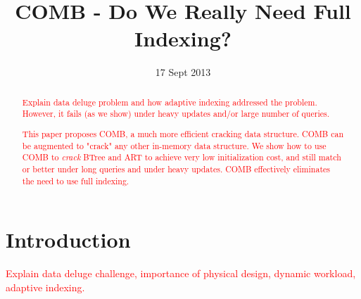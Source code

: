 \documentclass{sig-alternate}
\newcommand\todo[1]{\textcolor{red}{#1}}
\begin{document}
\title{COMB - Do We Really Need Full Indexing?}

\date{17 Sept 2013}

\maketitle
\begin{abstract}
\todo{Explain data deluge problem and how adaptive indexing addressed the problem.
However, it fails (as we show) under heavy updates and/or large number of queries. }

\todo{This paper proposes COMB, a much more efficient cracking data structure.
COMB can be augmented to "crack" any other in-memory data structure.
We show how to use COMB to {\em crack} BTree and ART to achieve 
very low initialization cost,
and still match or better under long queries and under heavy updates.
COMB effectively eliminates the need to use full indexing.
}

\end{abstract}



\section{Introduction}

\todo{Explain data deluge challenge, importance of physical design,
dynamic workload, adaptive indexing.}
\end{document}
